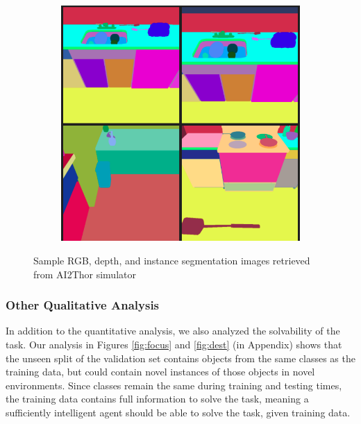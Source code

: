 \documentclass[11pt,a4paper]{article}
\begin{document}
\begin{figure}
\begin{subfigure}[b]{0.32\textwidth}
         \caption{}
     \end{subfigure}
     \hfill
     \begin{subfigure}[b]{0.32\textwidth}
         \centering
         \includegraphics[width=\textwidth]{figures/seg.png}
         \caption{}
     \end{subfigure}
        \caption{Sample RGB, depth, and instance segmentation images retrieved from AI2Thor simulator}
        \label{fig:sample_ims}
\end{figure}

\subsubsection{Other Qualitative Analysis}
In addition to the quantitative analysis, we also analyzed the solvability of the task. Our analysis in Figures \ref{fig:focus} and \ref{fig:dest} (in Appendix) shows that the unseen split of the validation set contains objects from the same classes as the training data, but could contain novel instances of those objects in novel environments. Since classes remain the same during training and testing times, the training data contains full information to solve the task, meaning a sufficiently intelligent agent should be able to solve the task, given training data.
\end{document}
